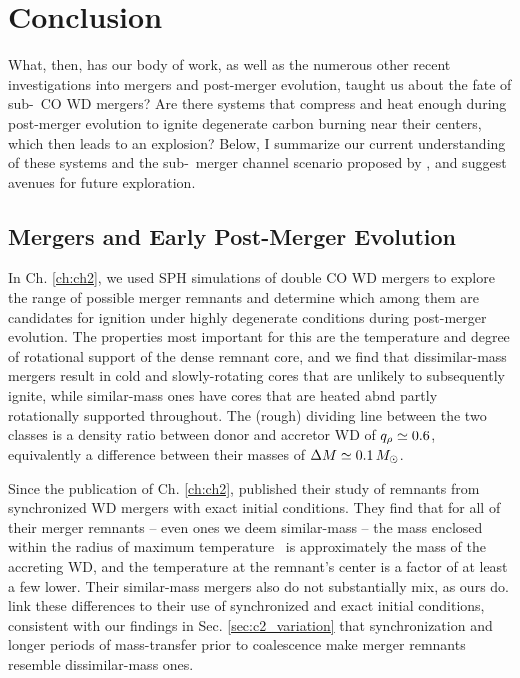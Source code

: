 \chapter{Conclusion}

What, then, has our body of work, as well as the numerous other recent investigations into mergers and post-merger evolution, taught us about the fate of sub-\Mch\ CO WD mergers?  Are there systems that compress and heat enough during post-merger evolution to ignite degenerate carbon burning near their centers, which then leads to an explosion?  Below, I summarize our current understanding of these systems and the sub-\Mch\ merger channel scenario proposed by \citeal{vkercj10}, and suggest avenues for future exploration.

\section{Mergers and Early Post-Merger Evolution}
\label{sec:c6_mergers_pme}

In Ch. \ref{ch:ch2}, we used SPH simulations of double CO WD mergers to explore the range of possible merger remnants and determine which among them are candidates for ignition under highly degenerate conditions during post-merger evolution.  The properties most important for this are the temperature and degree of rotational support of the dense remnant core, and we find that dissimilar-mass mergers result in cold and slowly-rotating cores that are unlikely to subsequently ignite, while similar-mass ones have cores that are heated abnd partly rotationally supported throughout.  The (rough) dividing line between the two classes is a density ratio between donor and accretor WD of $\qrho\simeq0.6$, equivalently a difference between their masses of $\Delta M \simeq 0.1\,\Msun$.

Since the publication of Ch. \ref{ch:ch2}, \cite{dan+14} published their study of remnants from synchronized WD mergers with exact initial conditions.  They find that for all of their merger remnants -- even ones we deem similar-mass -- the mass enclosed within the radius of maximum temperature \MencTmax\ is approximately the mass of the accreting WD, and the temperature at the remnant's center is a factor of at least a few lower.  Their similar-mass mergers also do not substantially mix, as ours do.  \cite{dan+14} link these differences to their use of synchronized and exact initial conditions, consistent with our findings in Sec. \ref{sec:c2_variation} that synchronization and longer periods of mass-transfer prior to coalescence make merger remnants resemble dissimilar-mass ones.

